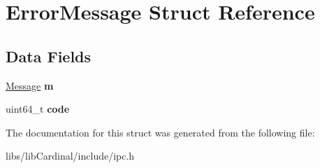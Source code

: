 \hypertarget{structErrorMessage}{}\section{Error\+Message Struct Reference}
\label{structErrorMessage}
\subsection*{Data Fields}
\begin{DoxyCompactItemize}
\item 
\hyperlink{structMessage}{Message} {\bfseries m}\hypertarget{structErrorMessage_aedd9812fb8bc7bcdc64291c50d160269}{}\label{structErrorMessage_aedd9812fb8bc7bcdc64291c50d160269}

\item 
uint64\+\_\+t {\bfseries code}\hypertarget{structErrorMessage_acfd25ea5c6dddd7fd0be64ef6f0e5b18}{}\label{structErrorMessage_acfd25ea5c6dddd7fd0be64ef6f0e5b18}

\end{DoxyCompactItemize}


The documentation for this struct was generated from the following file\+:\begin{DoxyCompactItemize}
\item 
libs/lib\+Cardinal/include/ipc.\+h\end{DoxyCompactItemize}
